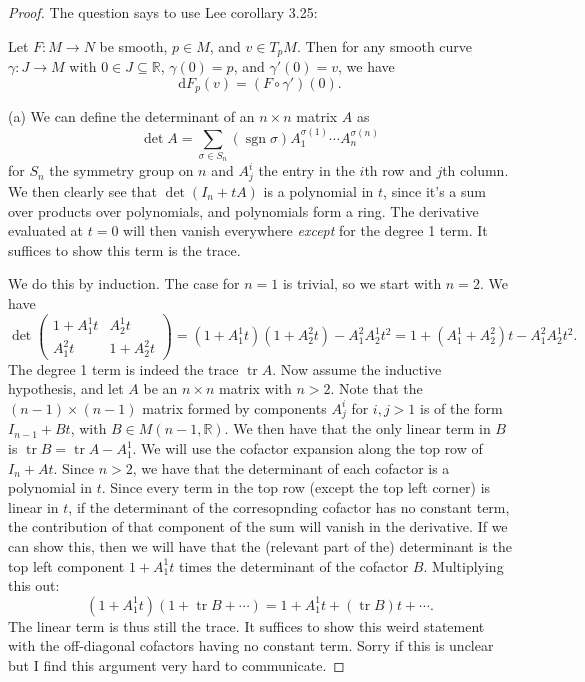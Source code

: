 \documentclass[11pt, letterpaper]{article}
\theoremstyle{plain}
\begin{document}
\begin{proof}
	The question says to use Lee corollary 3.25:\setcounter{definition}{24}
	\begin{corollary}\label{cor}
		Let $F : M \to N$ be smooth, $p\in M$, and $v\in T_pM$. Then for any smooth curve $\gamma : J \to M$ with $0\in J \subseteq \mathbb{R} $, $\gamma (0)=p$, and $\gamma '(0)=v$, we have
		\[
			\mathrm{d} F_p(v)=(F\circ \gamma ')(0)
		.\]
	\end{corollary}
	
	(a) We can define the determinant of an $n\times n$ matrix $A$ as
	\[
		\det A=\sum_{\sigma \in S_n} (\operatorname{sgn} \sigma )A_1^{\sigma (1)} \cdots A_n ^{\sigma (n)} 
	\]
	for $S_n$ the symmetry group on $n$ and $A^i_j$ the entry in the $i$th row and $j$th column. We then clearly see that $\det (I_n+tA)$ is a polynomial in $t$, since it's a sum over products over polynomials, and polynomials form a ring. The derivative evaluated at $t=0$ will then vanish everywhere \emph{except} for the degree 1 term. It suffices to show this term is the trace.

	We do this by induction. The case for $n=1$ is trivial, so we start with $n=2$. We have
	\[
		\det \begin{pmatrix}
		1+A^1_1t & A_2^1t \\
		A_1^2t & 1+A_2^2t
		\end{pmatrix}=\left( 1+A_1^1t \right) \left( 1+A_2^2t \right) -A_1^2A_2^1t^2=1+(A_1^1+A_2^2)t-A_1^2A_2^1t^2
	.\]
	The degree 1 term is indeed the trace $\operatorname{tr} A$. Now assume the inductive hypothesis, and let $A$ be an $n\times n$ matrix with $n>2$. Note that the $(n-1)\times (n-1)$ matrix formed by components $A^i_j$ for $i,j > 1$ is of the form $I_{n-1} +Bt$, with $B\in M(n-1,\mathbb{R} )$. We then have that the only linear term in $B$ is $\operatorname{tr} B = \operatorname{tr} A - A_1^1$. We will use the cofactor expansion along the top row of $I_n+At$. Since $n>2$, we have that the determinant of each cofactor is a polynomial in $t$. Since every term in the top row (except the top left corner) is linear in $t$, if the determinant of the corresopnding cofactor has no constant term, the contribution of that component of the sum will vanish in the derivative. If we can show this, then we will have that the (relevant part of the) determinant is the top left component $1+A_1^1t$ times the determinant of the cofactor $B$. Multiplying this out:
	\[
		(1+A^1_1t)(1+ \operatorname{tr} B + \cdots) = 1 + A_1^1t + (\operatorname{tr} B )t + \cdots
	.\]
	The linear term is thus still the trace. It suffices to show this weird statement with the off-diagonal cofactors having no constant term. Sorry if this is unclear but I find this argument very hard to communicate.


\end{proof}
\end{document}

